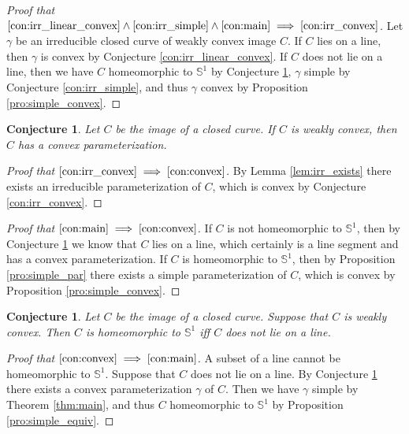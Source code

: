 \documentclass{amsart}
\newtheorem{conjecture}[proposition]{Conjecture}
\theoremstyle{definition}
\theoremstyle{remark}
\begin{document}
\begin{proof}[Proof that
        $\ref{con:irr_linear_convex}
            \land\ref{con:irr_simple}
            \land\ref{con:main}
            \implies\ref{con:irr_convex}$]
    \sloppy
    Let $\gamma$ be an irreducible closed curve of weakly convex
    image $C$. If $C$ lies on a line, then $\gamma$
    is convex by Conjecture \ref{con:irr_linear_convex}.
    If $C$ does not lie on a line,
    then we have $C$ homeomorphic to $\mathbb{S}^1$ by Conjecture \ref{con:main},
    $\gamma$ simple by Conjecture \ref{con:irr_simple},
    and thus $\gamma$ convex by Proposition \ref{pro:simple_convex}.
\end{proof}

\begin{conjecture}
    \label{con:convex}
    Let $C$ be the image of a closed curve. If $C$ is weakly convex,
    then $C$ has a convex parameterization.
\end{conjecture}

\begin{proof}[Proof that $\ref{con:irr_convex}
            \implies\ref{con:convex}$]
    By Lemma \ref{lem:irr_exists} there exists an irreducible
    parameterization of $C$,
    which is convex by Conjecture \ref{con:irr_convex}.
\end{proof}

\begin{proof}[Proof that $\ref{con:main}\implies\ref{con:convex}$]
    If $C$ is not homeomorphic to $\mathbb{S}^1$, then by Conjecture
    \ref{con:main} we know that $C$ lies on a line,
    which certainly is a line segment and has a convex parameterization.
    If $C$ is homeomorphic to $\mathbb{S}^1$, then by Proposition \ref{pro:simple_par}
    there exists a simple parameterization of $C$,
    which is convex by Proposition \ref{pro:simple_convex}.
\end{proof}

\begin{conjecture}
    \label{con:main}
    Let $C$ be the image of a closed curve.
    Suppose that $C$ is weakly convex. Then $C$ is homeomorphic
    to $\mathbb{S}^1$ iff $C$ does not lie on a line.
\end{conjecture}

\begin{proof}[Proof that $\ref{con:convex}\implies\ref{con:main}$]
    A subset of a line cannot be homeomorphic to $\mathbb{S}^1$.
    Suppose that $C$ does not lie on a line. By Conjecture
    \ref{con:convex} there exists a convex parameterization
    $\gamma$ of $C$. Then we have $\gamma$ simple by Theorem
    \ref{thm:main}, and thus $C$ homeomorphic to $\mathbb{S}^1$ by
    Proposition \ref{pro:simple_equiv}.
\end{proof}
\end{document}
